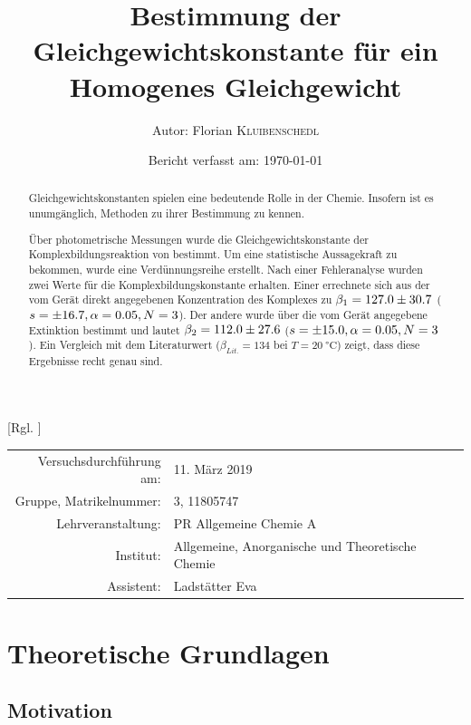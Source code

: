 \documentclass{article}
\title{Bestimmung der Gleichgewichtskonstante für ein Homogenes Gleichgewicht \cite{Versuchsvorschrift}} %
\author{Autor: Florian \textsc{Kluibenschedl}} %
\date{Bericht verfasst am: \today} %
\begin{document}
  [Rgl. ]{}{}
  
  \maketitle %
  
  \begin{center}
    \begin{tabular}{r p{4cm}}
      Versuchsdurchführung am: & 11. März 2019\\ %
      Gruppe, Matrikelnummer: & 3, 11805747 \\
      Lehrveranstaltung: & PR Allgemeine Chemie A \\
      Institut: & Allgemeine, Anorganische und Theoretische Chemie \\
      Assistent: & Ladstätter Eva %
    \end{tabular}
  \end{center}


  \begin{abstract}
    Gleichgewichtskonstanten spielen eine bedeutende Rolle in der Chemie. Insofern ist es unumgänglich, Methoden zu ihrer Bestimmung zu kennen. 
    
    Über photometrische Messungen wurde die Gleichgewichtskonstante der Komplexbildungsreaktion von \ch{[Fe(OH2)5SCN]\pch[2]} bestimmt. Um eine statistische Aussagekraft zu bekommen, wurde eine Verdünnungsreihe erstellt. Nach einer Fehleranalyse wurden zwei Werte für die Komplexbildungskonstante erhalten. Einer errechnete sich aus der vom Gerät direkt angegebenen Konzentration des Komplexes zu $\beta_{1} = \num[separate-uncertainty]{127 \pm 30.7}$ ($s=\num{\pm 16.7},\alpha=0.05,N=3$). Der andere wurde über die vom Gerät angegebene Extinktion bestimmt und lautet $\beta_{2} = \num[separate-uncertainty]{112 \pm 27.6}$ ($s=\num{\pm 15.0},\alpha=0.05,N=3$). Ein Vergleich mit dem Literaturwert ($\beta_{Lit.} = 134$ bei $T=\SI[mode=text]{20}{\degreeCelsius}$) zeigt, dass diese Ergebnisse recht genau sind. 
  \end{abstract}
  
  \pagebreak
  
  \section{Theoretische Grundlagen}
  
    \subsection{Motivation} \label{sec:Motivation}
      
\end{document}
